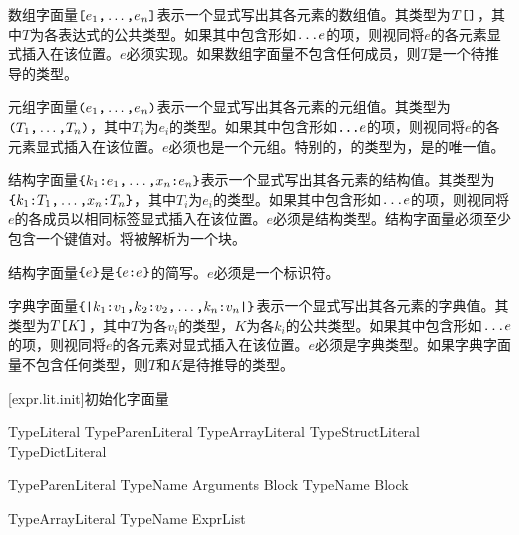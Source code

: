 \pnum
数组字面量$\texttt{[}e_1\texttt{,}\ldots\texttt{,}e_n\texttt{]}$表示一个显式写出其各元素的数组值。其类型为$T\texttt{[]}$，其中$T$为各表达式的公共类型。如果其中包含形如$\texttt{...}e$的项，则视同将$e$的各元素显式插入在该位置。$e$必须实现。如果数组字面量不包含任何成员，则$T$是一个待推导的类型。

\pnum
元组字面量$\texttt{(}e_1\texttt{,}\ldots\texttt{,}e_n\texttt{)}$表示一个显式写出其各元素的元组值。其类型为$\texttt{(}T_1\texttt{,}\ldots\texttt{,}T_n\texttt{)}$，其中$T_i$为$e_i$的类型。如果其中包含形如$\texttt{...}e$的项，则视同将$e$的各元素显式插入在该位置。$e$必须也是一个元组。特别的，\tcode{()}的类型为，是的唯一值。

\pnum
结构字面量$\texttt{\{}k_1\texttt{:}e_1\texttt{,}\ldots\texttt{,}x_n\texttt{:}e_n\texttt{\}}$表示一个显式写出其各元素的结构值。其类型为$\texttt{\{}k_1\texttt{:}T_1\texttt{,}\ldots\texttt{,}x_n\texttt{:}T_n\texttt{\}}$，其中$T_i$为$e_i$的类型。如果其中包含形如$\texttt{...}e$的项，则视同将$e$的各成员以相同标签显式插入在该位置。$e$必须是结构类型。\enternote 结构字面量必须至少包含一个键值对。\tcode{\{\}}将被解析为一个块。 \exitnote

\pnum
结构字面量$\texttt{\{}e\texttt{\}}$是$\texttt{\{}e\texttt{:}e\texttt{\}}$的简写。$e$必须是一个标识符。

\pnum
字典字面量$\texttt{\{|}k_1\texttt{:} v_1\texttt{,} k_2\texttt{:} v_2\texttt{,} \ldots\texttt{,} k_n\texttt{:} v_n\texttt{|\}}$表示一个显式写出其各元素的字典值。其类型为$T\texttt{[}K\texttt{]}$，其中$T$为各$v_i$的类型，$K$为各$k_i$的公共类型。如果其中包含形如$\texttt{...}e$的项，则视同将$e$的各元素对显式插入在该位置。$e$必须是字典类型。如果字典字面量不包含任何类型，则$T$和$K$是待推导的类型。

[expr.lit.init]{初始化字面量}

\begin{bnf}{TypeLiteral}
    TypeParenLiteral \br
    TypeArrayLiteral \br
    TypeStructLiteral \br
    TypeDictLiteral
\end{bnf}

\begin{bnf}{TypeParenLiteral}
    TypeName \terminal{(} Arguments\bnfq \terminal{)} Block\bnfs \br
    TypeName Block
\end{bnf}

\begin{bnf}{TypeArrayLiteral}
    TypeName \terminal{[} ExprList\bnfq \terminal{]}
\end{bnf}

